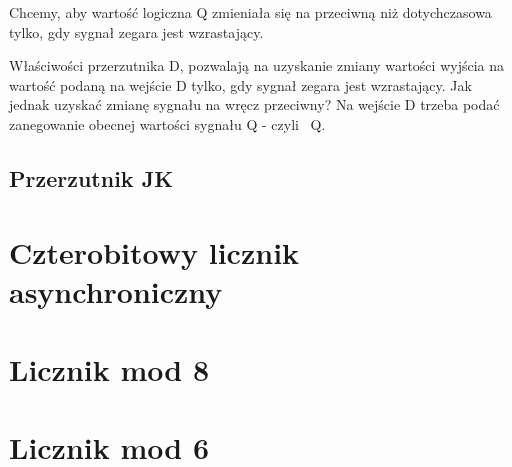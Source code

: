 \documentclass[12pt,a4paper]{article}
\begin{document}
Chcemy, aby wartość logiczna Q zmieniała się na przeciwną niż dotychczasowa tylko, gdy sygnał zegara jest wzrastający.

Właściwości przerzutnika D, pozwalają na uzyskanie zmiany wartości wyjścia na wartość podaną na wejście D tylko, gdy sygnał zegara jest wzrastający. Jak jednak uzyskać zmianę sygnału na wręcz przeciwny? 
Na wejście D trzeba podać zanegowanie obecnej wartości sygnału Q - czyli ~Q.


\subsection{Przerzutnik JK}


\section{Czterobitowy licznik asynchroniczny}

\section{Licznik mod 8}

\section{Licznik mod 6}
\end{document}
